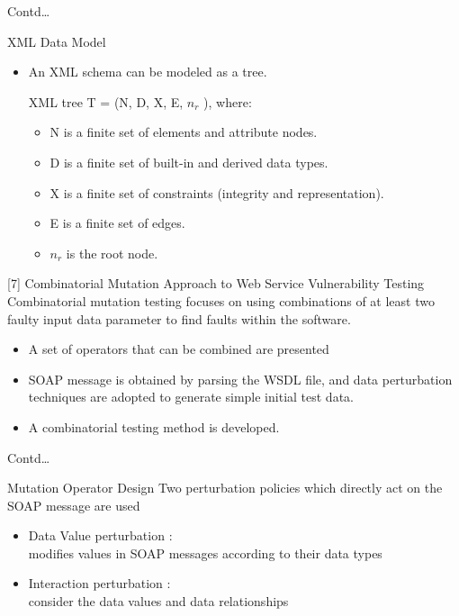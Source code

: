 \documentclass{bredelebeamer}
\begin{document}
\begin{frame}{Contd\dots}
	\begin{block}{XML Data Model}
		\begin{itemize}
			\large
			\item An XML schema can be modeled as a tree.
			\newline
			
			
			XML tree T = (N, D, X, E, $n_r$ ), where:\\
			\begin{itemize}
				\large
				\item N is a finite set of elements and attribute nodes.
				\item D is a finite set of built-in and derived data types.
				\item X is a finite set of constraints (integrity and representation).
				\item E is a finite set of edges.
				
				\item   $n_r$ is the root node.
			\end{itemize}
			
		\end{itemize}
	\end{block}
\end{frame}
\begin{frame}{[7] Combinatorial Mutation Approach to Web Service Vulnerability Testing }
	\large
	Combinatorial mutation
	testing focuses on using combinations of at least two faulty
	input data parameter to find faults within the software.\newline
	\begin{itemize}
		\large
		\item A set of operators that can be combined are presented
		\item SOAP message is obtained by parsing the WSDL file, and data perturbation techniques are adopted to generate simple initial test data.
		\item A combinatorial testing method is developed.
	\end{itemize}
	
\end{frame}
\begin{frame}{Contd\dots}
	
	
	\begin{block}{Mutation Operator Design}
		\large
		Two perturbation policies which directly act on the SOAP message are used\newline
		\begin{itemize}
			\large
			\item Data Value perturbation :\\
			modifies
			values in SOAP messages according to their data types\newline
			\item Interaction perturbation :\\
			consider the data values and data relationships
		\end{itemize}
	\end{block}
\end{frame}
\end{document}
